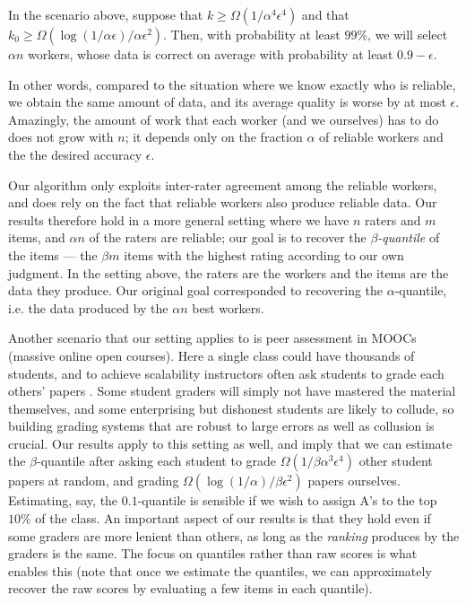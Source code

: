 \begin{theorem}
\label{thm:intro}
In the scenario above, suppose that $k \geq \Omega(1/\alpha^4\epsilon^4)$
and that $k_0 \geq \Omega(\log(1/\alpha\epsilon)/\alpha\epsilon^2)$. Then, with probability 
at least $99\%$, we will select $\alpha n$ workers, whose data is correct on 
average with probability at least $0.9-\epsilon$.
\end{theorem}
In other words, compared to the situation where we know exactly who is reliable, 
we obtain the same amount of data, and its average quality is worse by at most 
$\epsilon$. Amazingly, the amount of work that each worker (and we ourselves) has 
to do does not grow with $n$; it depends only on the fraction $\alpha$ of 
reliable workers and the the desired accuracy $\epsilon$.

Our algorithm only exploits inter-rater agreement among the reliable workers, 
and does rely on the fact that reliable workers also produce reliable data.
Our results therefore hold in a more general setting where we have $n$ raters and 
$m$ items, and $\alpha n$ of the raters are reliable; our goal is to 
recover the \emph{$\beta$-quantile} of the items --- the $\beta m$ items 
with the highest rating according to our own judgment. In the setting above, 
the raters are the workers and the items are the data they produce. Our original 
goal corresponded to recovering the $\alpha$-quantile, i.e. the data 
produced by the $\alpha n$ best workers.

Another scenario that our setting applies to is peer assessment in MOOCs (massive 
online open courses). Here a single class could have thousands of students, 
and to achieve scalability instructors often ask students to grade each others' 
papers \citep{kulkarni2015peer,piech2013tuned}. 
Some student graders will simply not have mastered the material themselves, 
and some enterprising but dishonest students are likely to collude, 
so building grading systems that are robust to large errors as well as 
collusion is crucial. 
Our results apply to this setting as well, and imply that we can estimate the 
$\beta$-quantile after asking each student to grade 
$\Omega(1/\beta\alpha^3\epsilon^4)$ other student papers at random, and 
grading $\Omega(\log(1/\alpha)/\beta\epsilon^2)$ papers ourselves.
Estimating, say, the $0.1$-quantile is 
sensible if we wish to assign A's to the top $10\%$ of the class. 
An important aspect of our results is that they hold even if some graders are 
more lenient than others, as long as the \emph{ranking} produces by the graders 
is the same. The focus on quantiles rather than raw scores is what enables this 
(note that once we estimate the quantiles, we can approximately recover the 
raw scores by evaluating a few items in each quantile).

